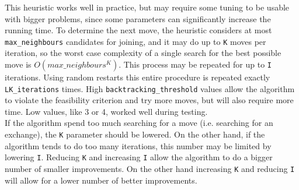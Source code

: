 This heuristic works well in practice, but may require some tuning to be usable with bigger problems, since some parameters can significantly increase the running time. To determine the next move, the heuristic considers at most \texttt{max\_neighbours} candidates for joining, and it may do up to \texttt{K} moves per iteration, so the worst case complexity of a single search for the best possible move is $O(max\_neighbours^K)$. This process may be repeated for up to \texttt{I} iterations. Using random restarts this entire procedure is repeated exactly \texttt{LK\_iterations} times. High \texttt{backtracking\_threshold} values allow the algorithm to violate the feasibility criterion and try more moves, but will also require more time. Low values, like 3 or 4, worked well during testing.\\
If the algorithm spend too much searching for a move (i.e. searching for an exchange), the \texttt{K} parameter should be lowered. On the other hand, if the algorithm tends to do too many iterations, this number may be limited by lowering \texttt{I}. Reducing \texttt{K} and increasing \texttt{I} allow the algorithm to do a bigger number of smaller improvements. On the other hand increasing \texttt{K} and reducing \texttt{I} will allow for a lower number of better improvements.

